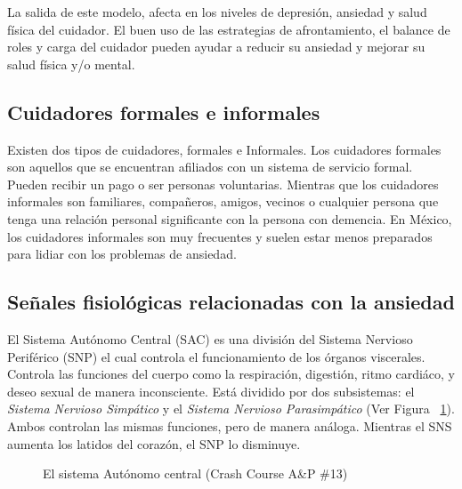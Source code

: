 	La salida de este modelo, afecta en los niveles de depresi\'on, ansiedad y salud f\'isica del cuidador. El buen uso de las estrategias de afrontamiento, el balance de roles y carga del cuidador pueden ayudar a reducir su ansiedad y mejorar su salud f\'isica y/o mental.

	\subsection{Cuidadores formales e informales}\label{secc:caregivers}
		Existen dos tipos de cuidadores, formales e Informales. Los cuidadores formales son aquellos que se encuentran afiliados con un sistema de servicio formal. Pueden recibir un pago o ser personas voluntarias. Mientras que los cuidadores informales son familiares, compa\~neros, amigos, vecinos o cualquier persona que tenga una relaci\'on personal significante con la persona con demencia. En M\'exico, los cuidadores informales son muy frecuentes y suelen estar menos preparados para lidiar con los problemas de ansiedad.

	\subsection{Se\~nales fisiol\'ogicas relacionadas con la ansiedad}\label{secc:signals}
	El Sistema Aut\'onomo Central (SAC) es una divisi\'on del Sistema Nervioso Perif\'erico (SNP) el cual controla el funcionamiento de los \'organos viscerales. Controla las funciones del cuerpo como la respiraci\'on, digesti\'on, ritmo cardi\'aco, y deseo sexual de manera inconsciente. Est\'a dividido por dos subsistemas: el \textit{Sistema Nervioso Simp\'atico} y el \textit{Sistema Nervioso Parasimp\'atico} (Ver Figura ~\ref{fig:modeloSNP}). Ambos controlan las mismas funciones, pero de manera an\'aloga. Mientras el SNS aumenta los latidos del coraz\'on, el SNP lo disminuye.

\begin{figure}[h]
	\centering
	\caption{El sistema Aut\'onomo central (Crash Course A\&P \#13) \label{fig:modeloSNP}}
\end{figure}

